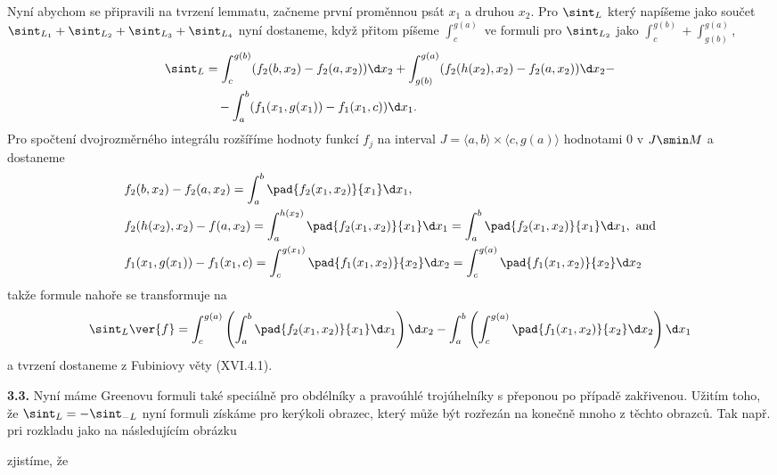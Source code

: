 \documentclass[12pt]{article}
\begin{document}
Nyní abychom se připravili na tvrzení lemmatu, začneme 
 první proměnnou psát $x_1$ a druhou $x_2$. Pro $\sint_{L}$ který napíšeme jako součet $\sint_{L_1}+\sint_{L_2}+\sint_{L_3}+\sint_{L_4}$ nyní dostaneme, když přitom píšeme $\int_c^{g(a)}$ ve formuli pro
 $\sint_{L_2}$ jako $\int_c^{g(b)}+\int_{g(b)}^{g(a)}$,
 $$
 \begin{aligned}
 \sint_L&=\int_c^{g(b)}(f_2(b,x_2)-f_2(a,x_2))\d x_2+\int_{g(b)}^{g(a)}(f_2(h(x_2),x_2)-f_2(a,x_2))\d x_2-\\
 &\quad-\int_a^b(f_1(x_1,g(x_1))-f_1(x_1,c))\d x_1.
 \end{aligned}
 $$
 Pro spočtení dvojrozměrného integrálu rozšíříme hodnoty funkcí $f_j$ na interval $J=\langle a,b\rangle\times\langle c,g(a)\rangle$ hodnotami $0$ v $J\smin M$ a dostaneme
 $$
 \begin{aligned}
 &f_2(b,x_2)-f_2(a,x_2)=\int_a^b\pad{f_2(x_1,x_2)}{x_1}\d x_1,\\ &f_2(h(x_2),x_2)-f(a,x_2)=\int_a^{h(x_2)}\pad{f_2(x_1,x_2)}{x_1}\d x_1=\int_a^{b}\pad{f_2(x_1,x_2)}{x_1}\d x_1,  \ \text{and}\\ 
&f_1(x_1,g(x_1))-f_1(x_1,c)=\int_c^{g(x_1)}\pad{f_1(x_1,x_2)}{x_2}\d x_2=\int_c^{g(a)}\pad{f_1(x_1,x_2)}{x_2}\d x_2
\end{aligned}
$$
takže formule nahoře se transformuje na
$$
\sint_L\ver{f}=\int_c^{g(a)}\left(\int_a^b\pad{f_2(x_1,x_2)}{x_1}\d x_1\right)\d x_2-
\int_a^b\left(\int_c^{g(a)}\pad{f_1(x_1,x_2)}{x_2}\d x_2\right)\d x_1
$$
a tvrzení dostaneme z Fubiniovy věty (XVI.4.1).\sq

\bigskip

{\bf 3.3.} Nyní máme  Greenovu formuli také speciálně pro obdélníky a pravoúhlé trojúhelníky s přeponou po případě zakřivenou. Užitím toho, že  $\sint_L=-\sint_{-L}$ nyní formuli získáme pro kerýkoli obrazec, který může být rozřezán na konečně mnoho z těchto obrazců. Tak např. pri rozkladu jako na následujícím obrázku 

\vskip1mm

\centerline{
\xymatrix@=0.7mm{&&&&\cdot\ar[dddddllll]\ar@<0.5ex>[ddddd]&&&&&&&\\
&&&&&&&&&&\\
&&&&&&&&&&&\\
&&&&&&&&&&\\
&&&&&&&&&&&\\
\cdot\ar[rrrr]&&&&\cdot\ar@<0.5ex>[uuuuu]\ar[rrrrrrr]&&&&&&&\cdot\ar[uuuuulllllll]
}}

\vskip1mm

\noindent zjistíme, že
\end{document}
